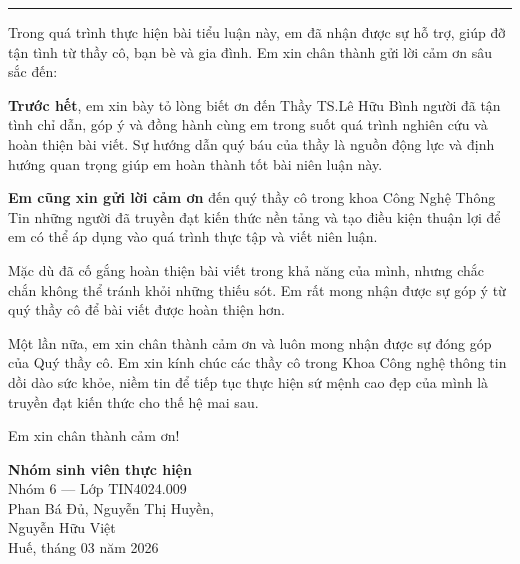 \documentclass[13pt,a4paper]{article}
\begin{document}
\newpage
\thispagestyle{empty}
\vspace*{0.35\baselineskip}
{\normalsize
    \tableofcontents
}
\newpage
\thispagestyle{empty}
\vspace*{0.4cm}
\begin{center}
    \fontsize{19}{24}\selectfont\bfseries{}\par
    \vspace{0.25ex}
    \rule{0.30\textwidth}{1.8pt}
\end{center}
\vspace{0.85cm}

{}

\parindent=1.1cm
\setlength{\parskip}{0.6ex plus 0.2ex}
Trong quá trình thực hiện bài tiểu luận này, em đã nhận được sự hỗ trợ, giúp đỡ tận tình từ thầy cô, bạn bè và gia đình. Em xin chân thành gửi lời cảm ơn sâu sắc đến:

\textbf{Trước hết}, em xin bày tỏ lòng biết ơn đến Thầy TS.Lê Hữu Bình người đã tận tình chỉ dẫn, góp ý và đồng hành cùng em trong suốt quá trình nghiên cứu và hoàn thiện bài viết. Sự hướng dẫn quý báu của thầy là nguồn động lực và định hướng quan trọng giúp em hoàn thành tốt bài niên luận này.

\textbf{Em cũng xin gửi lời cảm ơn} đến quý thầy cô trong khoa Công Nghệ Thông Tin những người đã truyền đạt kiến thức nền tảng và tạo điều kiện thuận lợi để em có thể áp dụng vào quá trình thực tập và viết niên luận.

Mặc dù đã cố gắng hoàn thiện bài viết trong khả năng của mình, nhưng chắc chắn không thể tránh khỏi những thiếu sót. Em rất mong nhận được sự góp ý từ quý thầy cô để bài viết được hoàn thiện hơn.

Một lần nữa, em xin chân thành cảm ơn và luôn mong nhận được sự đóng góp của Quý thầy cô. Em xin kính chúc các thầy cô trong Khoa Công nghệ thông tin dồi dào sức khỏe, niềm tin để tiếp tục thực hiện sứ mệnh cao đẹp của mình là truyền đạt kiến thức cho thế hệ mai sau.

Em xin chân thành cảm ơn!

\parindent=0pt
\parskip=0pt
\vspace{0.8cm}
\hfill\begin{minipage}[t]{7cm}
    \fontsize{12}{15}\selectfont
    \begin{flushright}
        \textbf{Nhóm sinh viên thực hiện}\\
        Nhóm 6 --- Lớp TIN4024.009\\
        Phan Bá Đủ, Nguyễn Thị Huyền,\\
        Nguyễn Hữu Việt\\[0.5em]
        Huế, tháng 03 năm 2026
    \end{flushright}
\end{minipage}
\end{document}
